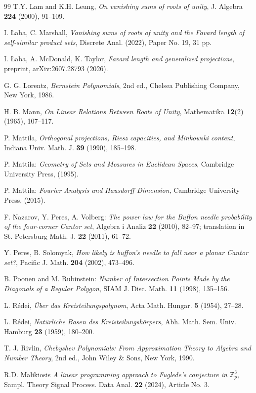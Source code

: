 \documentclass[12pt]{amsart}
\numberwithin{equation}{section}
\begin{document}
\begin{thebibliography}{99}
 T.Y. Lam and K.H. Leung, {\it On vanishing sums of roots of unity},
J. Algebra {\bf 224} (2000), 91--109.

 I. {\L}aba, C. Marshall, {\it Vanishing sums of roots of unity and the Favard length of self-similar product sets}, Discrete Anal. (2022), Paper No. 19, 31 pp.

 I. {\L}aba, A. McDonald, K. Taylor, {\it Favard length and generalized projections}, preprint, arXiv:2607.28793 (2026).

 G. G. Lorentz, {\it Bernstein Polynomials}, 2nd ed., Chelsea Publishing Company, New York, 1986.

 H. B. Mann, {\it On Linear Relations Between Roots of Unity}, Mathematika {\bf 12}(2) (1965), 107--117.

 P. Mattila, {\it Orthogonal projections, Riesz capacities, and 
Minkowski content}, Indiana Univ. Math. J. {\bf 39} (1990), 185--198.

P. Mattila: {\it Geometry of Sets and Measures in Euclidean Spaces}, Cambridge University Press, (1995).

P. Mattila: {\it Fourier Analysis and Hausdorff Dimension}, Cambridge University Press, (2015).

 F. Nazarov, Y. Peres, A. Volberg: {\em  The power law for the Buffon needle probability of the four-corner Cantor set}, 
Algebra i Analiz {\bf 22} (2010), 82--97; translation in St. Petersburg Math. J. {\bf 22} (2011),  61--72.

 Y. Peres, B. Solomyak, {\it How likely is buffon's needle to fall near a
planar Cantor set?}, Pacific J. Math. {\bf 204} (2002), 473--496.

B. Poonen and M. Rubinstein: {\it Number of Intersection Points Made by the Diagonals of a Regular Polygon}, SIAM J. Disc. Math. {\bf 11} (1998), 135--156.

 L. R\'edei, {\it \"Uber das Kreisteilungspolynom}, Acta Math. Hungar. {\bf 5} (1954), 27--28.

 L. R\'edei, {\it Nat\"urliche Basen des Kreisteilungsk\"orpers}, Abh. Math. Sem. Univ. Hamburg {\bf 23} (1959), 180--200.

 T. J. Rivlin, {\it Chebyshev Polynomials: From Approximation Theory to Algebra and Number Theory}, 2nd ed., John Wiley \& Sons, New York, 1990.

 R.D. Malikiosis {\it A linear programming approach to Fuglede’s conjecture in $\mathbb{Z}_p^3$}, Sampl. Theory Signal Process. Data Anal. {\bf 22} (2024), Article No. 3.


\end{thebibliography}
\end{document}
